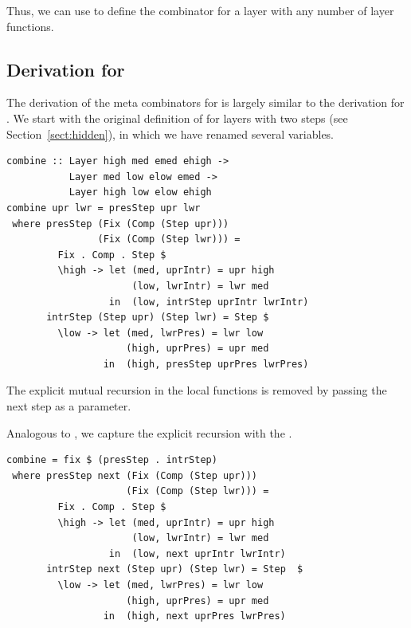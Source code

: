 \documentclass[preprint,natbib]{sigplanconf}
\begin{document}
Thus, we can use   to define the  combinator for a layer with any number of layer functions.


%																
\subsection{Derivation for } \label{subsubsectcombine}


The derivation of the meta combinators for  is largely similar to the derivation for . We start with the original definition of  for layers with two steps (see Section~\ref{sect:hidden}), in which we have renamed several variables. 


\begin{small} %
\begin{verbatim}
combine :: Layer high med emed ehigh -> 
           Layer med low elow emed -> 
           Layer high low elow ehigh
combine upr lwr = presStep upr lwr
 where presStep (Fix (Comp (Step upr))) 
                (Fix (Comp (Step lwr))) = 
         Fix . Comp . Step $ 
         \high -> let (med, uprIntr) = upr high
                      (low, lwrIntr) = lwr med
                  in  (low, intrStep uprIntr lwrIntr)
       intrStep (Step upr) (Step lwr) = Step $
         \low -> let (med, lwrPres) = lwr low
                     (high, uprPres) = upr med
                 in  (high, presStep uprPres lwrPres)
\end{verbatim}
\end{small}

The explicit mutual recursion in the local functions is removed by passing the next step as a parameter.

Analogous to , we capture the explicit recursion with the .

\begin{small} %
\begin{verbatim}
combine = fix $ (presStep . intrStep) 
 where presStep next (Fix (Comp (Step upr)))
                     (Fix (Comp (Step lwr))) =
         Fix . Comp . Step $ 
         \high -> let (med, uprIntr) = upr high
                      (low, lwrIntr) = lwr med
                  in  (low, next uprIntr lwrIntr)
       intrStep next (Step upr) (Step lwr) = Step  $
         \low -> let (med, lwrPres) = lwr low
                     (high, uprPres) = upr med
                 in  (high, next uprPres lwrPres)
\end{verbatim}%
\end{small}
\end{document}
